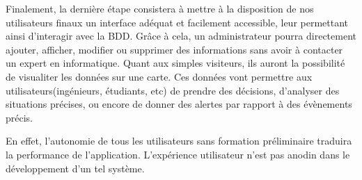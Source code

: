 \par
Finalement, la dernière étape consistera à mettre à la disposition 
de nos utilisateurs finaux un interface adéquat et facilement 
accessible, leur permettant ainsi d'interagir avec la BDD. Grâce 
à cela, un administrateur pourra directement ajouter, afficher, modifier ou supprimer 
des informations sans avoir à contacter un expert en informatique.
Quant aux simples visiteurs, ils auront la possibilité de visualiter les données sur une carte. 
Ces données vont permettre aux utilisateurs(ingénieurs, étudiants, etc) de prendre des décisions, 
d’analyser des situations précises, ou encore de donner des alertes par rapport à des évènements précis.
\par
En effet, l'autonomie de tous les utilisateurs sans formation préliminaire 
traduira la performance de l'application. L'expérience utilisateur n'est pas anodin dans 
le développement d'un tel système.